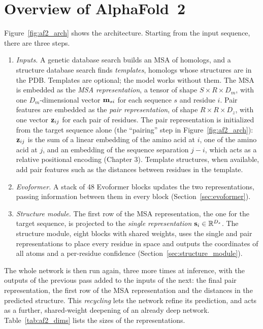 \section{Overview of AlphaFold~2}
\label{sec:overview}

Figure~\ref{fig:af2_arch} shows the architecture. Starting from the input sequence, there are three steps.

\begin{enumerate}
  \item \emph{Inputs.} A genetic database search builds an MSA of homologs, and a structure database search finds \emph{templates}, homologs whose structures are in the PDB. Templates are optional; the model works without them. The MSA is embedded as the \emph{MSA representation}, a tensor of shape $S\times R\times D_m$, with one $D_m$-dimensional vector $\mathbf{m}_{si}$ for each sequence $s$ and residue $i$. Pair features are embedded as the \emph{pair representation}, of shape $R\times R\times D_z$, with one vector $\mathbf{z}_{ij}$ for each pair of residues. The pair representation is initialized from the target sequence alone (the ``pairing'' step in Figure~\ref{fig:af2_arch}): $\mathbf{z}_{ij}$ is the sum of a linear embedding of the amino acid at $i$, one of the amino acid at $j$, and an embedding of the sequence separation $j-i$, which acts as a relative positional encoding (Chapter 3). Template structures, when available, add pair features such as the distances between residues in the template.
  \item \emph{Evoformer.} A stack of 48 Evoformer blocks updates the two representations, passing information between them in every block (Section~\ref{sec:evoformer}).
  \item \emph{Structure module.} The first row of the MSA representation, the one for the target sequence, is projected to the \emph{single representation} $\mathbf{s}_i\in\mathbb{R}^{D_s}$. The structure module, eight blocks with shared weights, uses the single and pair representations to place every residue in space and outputs the coordinates of all atoms and a per-residue confidence (Section~\ref{sec:structure_module}).
\end{enumerate}
The whole network is then run again, three more times at inference, with the outputs of the previous pass added to the inputs of the next: the final pair representation, the first row of the MSA representation and the distances in the predicted structure. This \emph{recycling} lets the network refine its prediction, and acts as a further, shared-weight deepening of an already deep network. Table~\ref{tab:af2_dims} lists the sizes of the representations.

